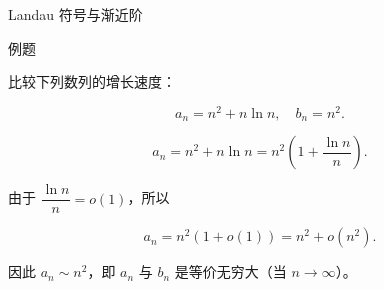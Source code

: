\documentclass[aspectratio=169,10pt,fontset=fandol]{ctexbeamer}
\begin{document}
\begin{frame}[t,fragile]{Landau 符号与渐近阶}
\normalsize
\begin{block}{例题}
{\normalsize


比较下列数列的增长速度：

\[

a_n = n^2 + n \ln n,\quad b_n = n^2.

\]



\begin{solution}

\[

a_n = n^2 + n \ln n = n^2 \left(1 + \dfrac{\ln n}{n}\right).

\]

由于 \(\dfrac{\ln n}{n} = o(1)\)，所以

\[

a_n = n^2 (1 + o(1)) = n^2 + o(n^2).

\]

因此 \(a_n \sim n^2\)，即 \(a_n\) 与 \(b_n\) 是等价无穷大（当 \(n \to \infty\)）。

\end{solution}


}
\end{block}
\end{frame}
\end{document}
